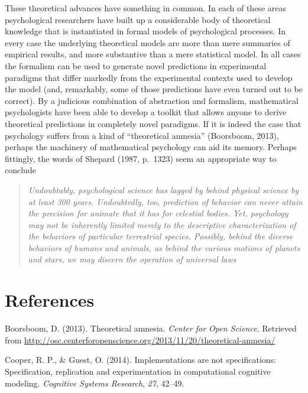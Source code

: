 \documentclass[english,doc]{apa6}
\begin{document}
These theoretical advances have something in common. In each of these areas psychological researchers have built up a considerable body of theoretical knowledge that is instantiated in formal models of psychological processes. In every case the underlying theoretical models are more than mere summaries of empirical results, and more substantive than a mere statistical model. In all cases the formalism can be used to generate novel predictions in experimental paradigms that differ markedly from the experimental contexts used to develop the model (and, remarkably, some of those predictions have even turned out to be correct). By a judicious combination of abstraction and formalism, mathematical psychologists have been able to develop a toolkit that allows anyone to derive theoretical predictions in completely novel paradigms. If it is indeed the case that psychology suffers from a kind of ``theoretical amnesia'' (Boorsboom, 2013), perhaps the machinery of mathematical psychology can aid its memory. Perhaps fittingly, the words of Shepard (1987, p.~1323) seem an appropriate way to conclude

\begin{quote}
\emph{Undoubtably, psychological science has lagged by behind physical science by at least 300 years. Undoubtedly, too, prediction of behavior can never attain the precision for animate that it has for celestial bodies. Yet, psychology may not be inherently limited merely to the descriptive characterization of the behaviors of particular terrestrial species. Possibly, behind the diverse behaviors of humans and animals, as behind the various motions of planets and stars, we may discern the operation of universal laws}
\end{quote}

\hypertarget{references}{%
\section{References}\label{references}}

\hypertarget{refs}{}
\leavevmode\hypertarget{ref-boorsbaum2013theoretical}{}%
Boorsboom, D. (2013). Theoretical amnesia. \emph{Center for Open Science}. Retrieved from \url{http://osc.centerforopenscience.org/2013/11/20/theoretical-amnesia/}

\leavevmode\hypertarget{ref-cooper2014implementations}{}%
Cooper, R. P., \& Guest, O. (2014). Implementations are not specifications: Specification, replication and experimentation in computational cognitive modeling. \emph{Cognitive Systems Research}, \emph{27}, 42--49.
\end{document}
